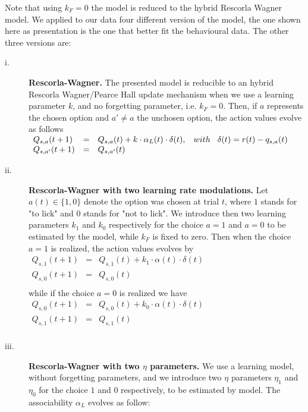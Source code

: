 Note that using $k_F = 0$ the model is reduced to the hybrid Rescorla Wagner model. We applied to our data four different version of the model, the one shown here as presentation is the one that better fit the behavioural data. The other three versions are:
\begin{description}
    \item[i.] \textbf{Rescorla-Wagner.} The presented model is reducible to an hybrid Rescorla Wagner/Pearce Hall update mechanism when we use a learning parameter $k$, and no forgetting parameter, i.e. $k_F = 0$.
    Then, if $a$ represents the chosen option and $a'\neq a$ the unchosen option, the action values evolve as follows\\
    $\begin{array}{lcl}
    Q_{s,a}(t+1)&=& Q_{s,a}(t)+k\cdot\alpha_L(t)\cdot\delta(t), \hspace{0.3cm} with \hspace{0.3cm}\delta(t)=r(t)-q_{s,a}(t)\\
    Q_{s,a'}(t+1)&=&Q_{s,a'}(t)\\
    \end{array}$
    \item[ii.] \textbf{Rescorla-Wagner with two learning rate modulations.} Let $a(t) \in \{1,0\}$ denote the option was chosen at trial $t$, where $1$ stands for "to lick" and $0$ stands for "not to lick". We introduce then two learning parameters $k_{1}$ and $k_{0}$ respectively for the choice $a=1$ and $a=0$ to be estimated by the model, while $k_F$ is fixed to zero.
    Then when the choice $a=1$ is realized, the action values evolves by\\
   $\begin{array}{lcl}
       Q_{s,1}(t+1)&=&Q_{s,1}(t)+k_1\cdot\alpha(t)\cdot\delta(t)\\
         Q_{s,0}(t+1)&=&Q_{s,0}(t)\\ 
    \end{array}$\\
    while if the choice $a=0$ is realized we have\\
    $\begin{array}{lcl}
       Q_{s,0}(t+1)&=&Q_{s,0}(t)+k_0\cdot\alpha(t)\cdot\delta(t)\\
         Q_{s,1}(t+1)&=&Q_{s,1}(t)\\ 
    \end{array}$
    \item[iii.] \textbf{Rescorla-Wagner with two $\eta$ parameters.} We use a learning model, without forgetting parameters, and we introduce two $\eta$ parameters $\eta_1$ and $\eta_0$ for the choice $1$ and $0$ respectively, to be estimated by model. The associability $\alpha_L$ evolves as follow:\\

\end{description}
